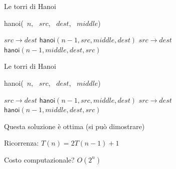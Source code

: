 \begin{frame}{Le torri di Hanoi}
\vspace{-12pt}
\begin{Procedure}
\caption[A]{\textsf{hanoi}(\INTEGER\ $n$, \INTEGER\ $\mathit{src}$, \INTEGER\ $\mathit{dest}$, \INTEGER\ $\mathit{middle}$)}

{
  \PRINT $\mathit{src} \rightarrow \mathit{dest}$\;
}
{
  $\textsf{hanoi}(n-1, \mathit{src}, \mathit{middle}, \mathit{dest})$\;
  \PRINT $\mathit{src} \rightarrow \mathit{dest}$\;
 	$\textsf{hanoi}(n-1, \mathit{middle}, \mathit{dest}, \mathit{src})$\;
}
\end{Procedure}

\end{frame}

\begin{frame}{Le torri di Hanoi}
\vspace{-12pt}
\begin{Procedure}
\caption[A]{\textsf{hanoi}(\INTEGER\ $n$, \INTEGER\ $\mathit{src}$, \INTEGER\ $\mathit{dest}$, \INTEGER\ $\mathit{middle}$)}

{
  \PRINT $\mathit{src} \rightarrow \mathit{dest}$\;
}
{
  $\textsf{hanoi}(n-1, \mathit{src}, \mathit{middle}, \mathit{dest})$\;
  \PRINT $\mathit{src} \rightarrow \mathit{dest}$\;
 	$\textsf{hanoi}(n-1, \mathit{middle}, \mathit{dest}, \mathit{src})$\;
}
\end{Procedure}

\BIL
\item Questa soluzione è ottima (si può dimostrare)
\item Ricorrenza: $T(n) = 2T(n-1)+1$
\item Costo computazionale? \pause \alert{$O(2^n)$}
\EIL

\end{frame}

